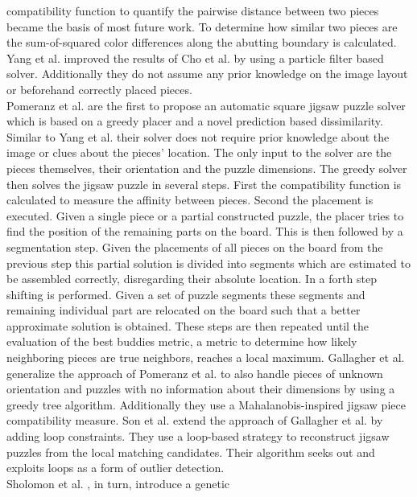 \documentclass[11pt]{report}
\begin{document}
compatibility function to quantify the pairwise distance between two pieces
became the basis of most future work. To determine how similar two pieces are
the sum-of-squared color differences along the abutting boundary is calculated.
Yang et al. \cite{yang2011particle} improved the results of Cho et al.
\cite{Cho2010} by using a particle filter based solver. Additionally they do not assume any
prior knowledge on the image layout or beforehand correctly placed pieces. \\
Pomeranz et al. \cite{Pomeranz2011} are the first to propose an automatic square
jigsaw puzzle solver which is based on a greedy placer and a novel prediction
based dissimilarity. Similar to Yang et al. \cite{yang2011particle} their solver
does not require prior knowledge about the image or clues about the pieces'
location. The only input to the solver are the pieces themselves, their
orientation and the puzzle dimensions. The greedy solver then solves the jigsaw
puzzle in several steps. First the compatibility function is calculated to
measure the affinity between pieces. Second the placement is executed. Given a
single piece or a partial constructed puzzle, the placer tries to find the
position of the remaining parts on the board. This is then followed by a
segmentation step. Given the placements of all pieces on the board from the
previous step this partial solution is divided into segments which are estimated
to be assembled correctly, disregarding their absolute location. In a forth step
shifting is performed. Given a set of puzzle segments these segments and
remaining individual part are relocated on the board such that a better
approximate solution is obtained. These steps are then repeated until the
evaluation of the best buddies metric, a metric to determine how likely
neighboring pieces are true neighbors, reaches a local maximum. Gallagher et al.
\cite{gallagher2012jigsaw} generalize the approach of Pomeranz et al.
\cite{Pomeranz2011} to also handle pieces of unknown orientation and puzzles
with no information about their dimensions by using a greedy tree algorithm.
Additionally they use a Mahalanobis-inspired jigsaw piece compatibility measure.
Son et al. \cite{son2014solving} extend the approach of Gallagher et al.
\cite{gallagher2012jigsaw} by adding loop constraints. They use a loop-based
strategy to reconstruct jigsaw puzzles from the local matching candidates. Their
algorithm seeks out and exploits loops as a form of outlier detection. 
\\
Sholomon et al. \cite{sholomon2013genetic}, in turn, introduce a genetic
\end{document}
